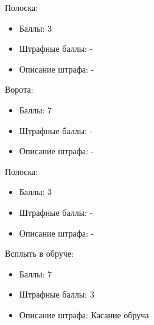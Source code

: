 \markSection

Полоска: 
\begin{itemize}
    \item Баллы: 3
    \item Штрафные баллы: -
    \item Описание штрафа: -
\end{itemize}

Ворота:
\begin{itemize}
    \item Баллы: 7
    \item Штрафные баллы: -
    \item Описание штрафа: -
\end{itemize}

Полоска: 
\begin{itemize}
    \item Баллы: 3
    \item Штрафные баллы: -
    \item Описание штрафа: -
\end{itemize}

Всплыть в обруче:
\begin{itemize}
    \item Баллы: 7
    \item Штрафные баллы: 3
    \item Описание штрафа: Касание обруча
\end{itemize}